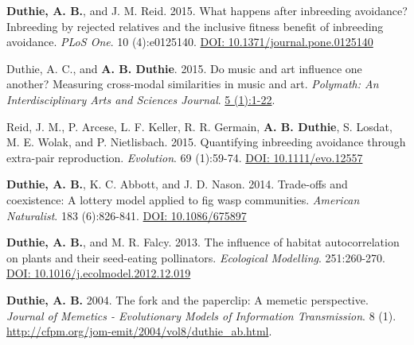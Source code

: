 \documentclass[letterpaper]{article}
\begin{document}
\begin{etaremune}
\item {\bf Duthie, A. B.}, and J. M. Reid. 2015. What happens after inbreeding avoidance? Inbreeding by rejected relatives and the inclusive fitness benefit of inbreeding avoidance. {\it PLoS One}. 10 (4):e0125140. \href{http://journals.plos.org/plosone/article?id=10.1371/journal.pone.0125140}{DOI: 10.1371/journal.pone.0125140}
\item Duthie, A. C., and {\bf A. B. Duthie}. 2015. Do music and art influence one another? Measuring cross-modal similarities in music and art. {\it Polymath: An Interdisciplinary Arts and Sciences Journal}. \href{https://ojcs.siue.edu/ojs/index.php/polymath/article/view/3013}{5 (1):1-22}.
\item Reid, J. M., P. Arcese, L. F. Keller, R. R. Germain, {\bf A. B. Duthie}, S. Losdat, M. E. Wolak, and P. Nietlisbach. 2015. Quantifying inbreeding avoidance through extra-pair reproduction. {\it Evolution}. 69 (1):59-74. \href{http://onlinelibrary.wiley.com/doi/10.1111/evo.12557/abstract}{DOI: 10.1111/evo.12557}
\item {\bf Duthie, A. B.}, K. C. Abbott, and J. D. Nason. 2014. Trade-offs and coexistence: A lottery model applied to fig wasp communities. {\it American Naturalist}. 183 (6):826-841. \href{http://www.jstor.org/stable/10.1086/675897}{DOI: 10.1086/675897}
\item {\bf Duthie, A. B.}, and M. R. Falcy. 2013. The influence of habitat autocorrelation on plants and their seed-eating pollinators. {\it Ecological Modelling}. 251:260-270. \href{http://www.sciencedirect.com/science/article/pii/S0304380013000021}{DOI: 10.1016/j.ecolmodel.2012.12.019}
\item {\bf Duthie, A. B.} 2004. The fork and the paperclip: A memetic perspective. {\it Journal of Memetics - Evolutionary Models of Information Transmission}. 8 (1). \href{http://cfpm.org/jom-emit/2004/vol8/duthie_ab.html}{http://cfpm.org/jom-emit/2004/vol8/duthie\_ab.html}.
\end{etaremune}

\end{document}
